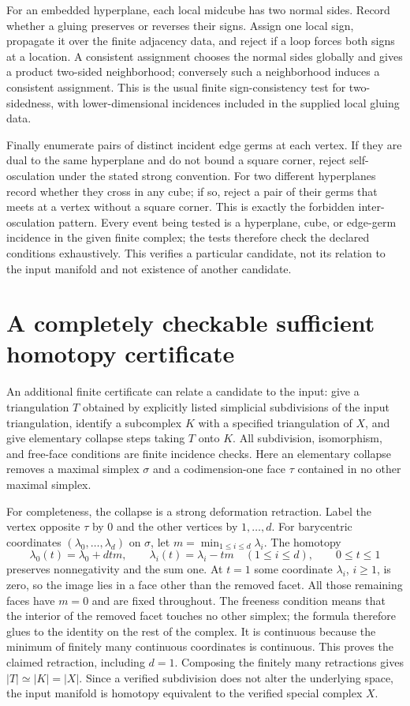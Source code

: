 \documentclass[11pt]{article}
\begin{document}
For an embedded hyperplane, each local midcube has two normal sides.
Record whether a gluing preserves or reverses their signs. Assign
one local sign, propagate it over the finite adjacency data, and reject
if a loop forces both signs at a location. A consistent assignment
chooses the normal sides globally and gives a product two-sided
neighborhood; conversely such a neighborhood induces a consistent
assignment. This is the usual finite sign-consistency test for
two-sidedness, with lower-dimensional incidences included in the
supplied local gluing data.

Finally enumerate pairs of distinct incident edge germs at each vertex.
If they are dual to the same hyperplane and do not bound a square
corner, reject self-osculation under the stated strong convention.
For two different hyperplanes record whether they cross in any cube;
if so, reject a pair of their germs that meets at a vertex without a
square corner. This is exactly the forbidden inter-osculation pattern.
Every event being tested is a hyperplane, cube, or edge-germ incidence
in the given finite complex; the tests therefore check the declared
conditions exhaustively. This verifies a particular candidate, not
its relation to the input manifold and not existence of another candidate.

\section{A completely checkable sufficient homotopy certificate}
An additional finite certificate can relate a candidate to the input:
give a triangulation $T$ obtained by explicitly listed simplicial
subdivisions of the input triangulation, identify a subcomplex $K$
with a specified triangulation of $X$, and give elementary collapse
steps taking $T$ onto $K$. All subdivision, isomorphism, and free-face
conditions are finite incidence checks. Here an elementary collapse
removes a maximal simplex $\sigma$ and a codimension-one face $\tau$
contained in no other maximal simplex.

For completeness, the collapse is a strong deformation retraction.
Label the vertex opposite $\tau$ by 0 and the other vertices by
$1,\ldots,d$. For barycentric coordinates
$(\lambda_0,\ldots,\lambda_d)$ on $\sigma$, let
$m=\min_{1\le i\le d}\lambda_i$. The homotopy
\[
\lambda_0(t)=\lambda_0+d t m,\qquad
\lambda_i(t)=\lambda_i-tm\quad(1\le i\le d),\qquad 0\le t\le1
\]
preserves nonnegativity and the sum one. At $t=1$ some coordinate
$\lambda_i$, $i\ge1$, is zero, so the image lies in a face other
than the removed facet. All those remaining faces have $m=0$ and
are fixed throughout. The freeness condition means that the interior
of the removed facet touches no other simplex; the formula therefore
glues to the identity on the rest of the complex. It is continuous
because the minimum of finitely many continuous coordinates is
continuous. This proves the claimed retraction, including $d=1$.
Composing the finitely many retractions gives $|T|\simeq|K|=|X|$.
Since a verified subdivision does not alter the underlying space,
the input manifold is homotopy equivalent to the verified special
complex $X$.
\end{document}
